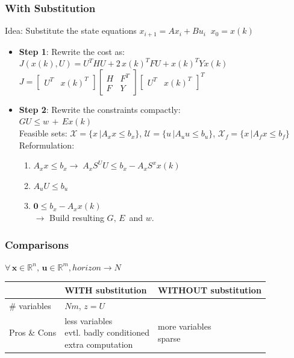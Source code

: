 \subsubsection{With Substitution}
Idea: Substitute the state equations $x_{i+1}=Ax_i+Bu_i\;\;x_0=x(k)$
\begin{itemize}
    \item \textbf{Step 1}: Rewrite the cost as: \\
    $J(x(k),U)=U^THU+2\,x(k)^TFU+x(k)^TYx(k)$\\
    $J=\begin{bmatrix}U^T & x(k)^T\end{bmatrix} \begin{bmatrix}H & F^T \\F & Y\end{bmatrix}\begin{bmatrix}U^T& x(k)^T\end{bmatrix}^T$
    \item \textbf{Step 2}: Rewrite the constraints compactly: \\
    $GU\leq w\,+\,Ex(k)$\\
    Feasible sets: $\mathcal{X}=\{ x\,|A_xx\leq b_x\}$, $\mathcal{U}=\{ u\,|A_uu\leq b_u\}$, $\mathcal{X}_f=\{ x\,|A_fx\leq b_f\}$\\
    Reformulation:
    \begin{enumerate}
        \item $A_xx\leq b_x \rightarrow\;A_xS^UU\leq b_x-A_xS^xx(k)$
        \item $A_uU\leq b_u$
        \item $\boldsymbol{0}\leq b_x-A_xx(k)$\\
        $\rightarrow$ Build resulting $G,\, E\,$ and $w$.
    \end{enumerate}
\end{itemize}
\subsubsection{Comparisons}
$\forall\, \boldsymbol{x}\in \mathbb{R}^n,\,\boldsymbol{u}\in\mathbb{R}^m, horizon \rightarrow N$ 
{\small
\begin{tabularx}{\linewidth}{l|X|X}
 & WITH substitution & WITHOUT substitution \\
\hline
\# variables 
& $Nm$, $z=U$ 
& \makecell[l]{$N(m+n)$ \; $z=\begin{bmatrix}X & U\end{bmatrix}^T$} \\

Pros \& Cons 
& \makecell[l]{less variables \\ evtl. badly conditioned \\ extra computation}
& \makecell[l]{more variables \\ sparse} \\
\end{tabularx}
}


